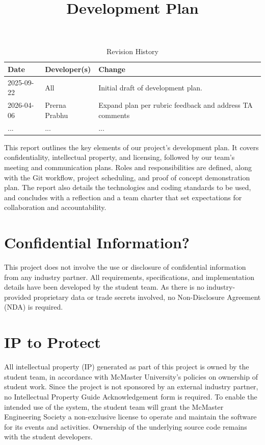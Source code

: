 \documentclass{article}
\title{Development Plan\\\progname}
\author{\authname}
\date{}
\begin{document}
\maketitle

\begin{table}[hp]
\caption{Revision History} \label{TblRevisionHistory}
\begin{tabularx}{\textwidth}{llX}
\toprule
\textbf{Date} & \textbf{Developer(s)} & \textbf{Change}\\
\midrule
2025-09-22 & All & Initial draft of development plan.\\
2026-04-06   & Prerna Prabhu & Expand plan per rubric feedback and address TA comments\\
... & ... & ...\\
\bottomrule
\end{tabularx}
\end{table}

\newpage{}

\noindent This report outlines the key elements of our project’s development plan. It covers confidentiality, intellectual property, and licensing, followed by our team’s meeting and communication plans. Roles and responsibilities are defined, along with the Git workflow, project scheduling, and proof of concept demonstration plan. The report also details the technologies and coding standards to be used, and concludes with a reflection and a team charter that set expectations for collaboration and accountability.

\section{Confidential Information?}

This project does not involve the use or disclosure of confidential information 
from any industry partner. All requirements, specifications, and implementation 
details have been developed by the student team. As there is no industry-provided proprietary data 
or trade secrets involved, no Non-Disclosure Agreement (NDA) is required. 

\section{IP to Protect}

All intellectual property (IP) generated as part of this project is owned by the 
student team, in accordance with McMaster University’s policies on ownership of 
student work. Since the project is not sponsored by an external industry partner, 
no Intellectual Property Guide Acknowledgement form is required. To enable the 
intended use of the system, the student team will grant the McMaster Engineering 
Society a non-exclusive license to operate and maintain the software for its 
events and activities. Ownership of the underlying source code remains with the 
student developers. 
\end{document}
